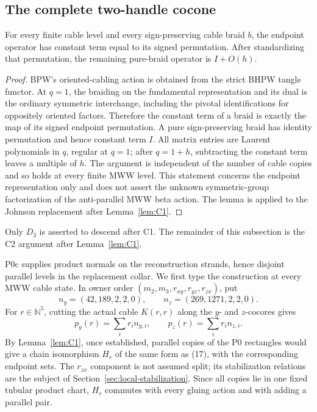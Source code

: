 \subsection{The complete two-handle cocone}

\begin{lemma}\label{lem:C2}
For every finite cable level and every sign-preserving cable braid \(b\),
the endpoint operator has constant term equal to its signed permutation.
After standardizing that permutation, the remaining pure-braid operator is
\(I+O(h)\).
\end{lemma}

\begin{proof}
BPW's oriented-cabling action is obtained from the strict BHPW tangle
functor.  At \(q=1\), the braiding on the fundamental representation and its
dual is the ordinary symmetric interchange, including the pivotal
identifications for oppositely oriented factors.  Therefore the constant
term of a braid is exactly the map of its signed endpoint permutation.  A
pure sign-preserving braid has identity permutation and hence constant term
\(I\).  All matrix entries are Laurent polynomials in \(q\), regular at
\(q=1\); after \(q=1+h\), subtracting the constant term leaves a multiple of
\(h\).  The argument is independent of the number of cable copies and so
holds at every finite MWW level.  This statement concerns the endpoint
representation only and does not assert the unknown symmetric-group
factorization of the anti-parallel MWW beta action.
The lemma is applied to the Johnson replacement after Lemma~\ref{lem:C1}.
\end{proof}

Only $D_3$ is asserted to descend after C1.  The remainder of this
subsection is the C2 argument after Lemma~\ref{lem:C1}.

P0c supplies product normals on the reconstruction strands, hence disjoint
parallel levels in the replacement collar.  We first type the construction at every MWW
cable state.  In owner order $(m_2,m_3,r_{xy},r_{yz},r_{zx})$, put
\[
n_y=(42,189,2,2,0),\qquad n_z=(269,1271,2,2,0).
\]
For $r\in\mathbb N^5$, cutting the actual cable $K(r,r)$ along the $y$- and
$z$-cocores gives
\[
p_y(r)=\sum_i r_i n_{y,i},\qquad
p_z(r)=\sum_i r_i n_{z,i}.
\tag{24}
\]
By Lemma~\ref{lem:C1}, once established, parallel copies of the P0 rectangles would give a chain isomorphism $H_r$ of the
same form as (17), with the corresponding endpoint sets.  The
$r_{zx}$ component is not assumed split; its stabilization relations are
the subject of Section~\ref{sec:local-stabilization}.  Since all
copies lie in one fixed tubular product chart, $H_r$ commutes with every
gluing action and with adding a parallel pair.

